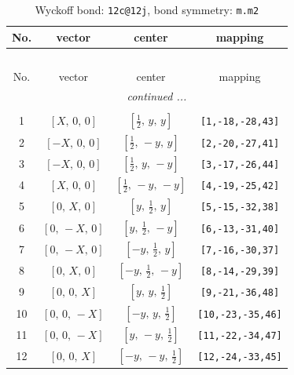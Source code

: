 \documentclass[fleqn,8pt]{jsarticle}
\begin{document}
\renewcommand{\arraystretch}{1.2}
\begin{longtable}{cccc}
\caption{Wyckoff bond: {\tt 12c@12j}, bond symmetry: {\tt m.m2}}
 \\
 \hline \hline
No. & vector & center & mapping \\ \hline \endfirsthead

\multicolumn{3}{l}{\tablename\ \thetable{}} \\
 \hline \hline
No. & vector & center & mapping \\ \hline \endhead

 \hline \hline
\multicolumn{3}{r}{\footnotesize\it continued ...} \\ \endfoot

 \hline \hline
\multicolumn{3}{r}{} \\ \endlastfoot

1 & $\left[ X,\, 0,\, 0 \right]$ & $\left[ \frac{1}{2},\, y,\, y \right]$ & {\tt [1,-18,-28,43]} \\ \hline
2 & $\left[ - X,\, 0,\, 0 \right]$ & $\left[ \frac{1}{2},\, - y,\, y \right]$ & {\tt [2,-20,-27,41]} \\ \hline
3 & $\left[ - X,\, 0,\, 0 \right]$ & $\left[ \frac{1}{2},\, y,\, - y \right]$ & {\tt [3,-17,-26,44]} \\ \hline
4 & $\left[ X,\, 0,\, 0 \right]$ & $\left[ \frac{1}{2},\, - y,\, - y \right]$ & {\tt [4,-19,-25,42]} \\ \hline
5 & $\left[ 0,\, X,\, 0 \right]$ & $\left[ y,\, \frac{1}{2},\, y \right]$ & {\tt [5,-15,-32,38]} \\ \hline
6 & $\left[ 0,\, - X,\, 0 \right]$ & $\left[ y,\, \frac{1}{2},\, - y \right]$ & {\tt [6,-13,-31,40]} \\ \hline
7 & $\left[ 0,\, - X,\, 0 \right]$ & $\left[ - y,\, \frac{1}{2},\, y \right]$ & {\tt [7,-16,-30,37]} \\ \hline
8 & $\left[ 0,\, X,\, 0 \right]$ & $\left[ - y,\, \frac{1}{2},\, - y \right]$ & {\tt [8,-14,-29,39]} \\ \hline
9 & $\left[ 0,\, 0,\, X \right]$ & $\left[ y,\, y,\, \frac{1}{2} \right]$ & {\tt [9,-21,-36,48]} \\ \hline
10 & $\left[ 0,\, 0,\, - X \right]$ & $\left[ - y,\, y,\, \frac{1}{2} \right]$ & {\tt [10,-23,-35,46]} \\ \hline
11 & $\left[ 0,\, 0,\, - X \right]$ & $\left[ y,\, - y,\, \frac{1}{2} \right]$ & {\tt [11,-22,-34,47]} \\ \hline
12 & $\left[ 0,\, 0,\, X \right]$ & $\left[ - y,\, - y,\, \frac{1}{2} \right]$ & {\tt [12,-24,-33,45]} \\
\end{longtable}
\end{document}
